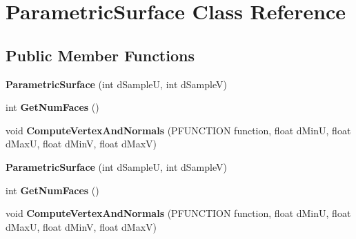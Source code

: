 \hypertarget{class_parametric_surface}{\section{Parametric\+Surface Class Reference}
\label{class_parametric_surface}
}
\subsection*{Public Member Functions}
\begin{DoxyCompactItemize}
\item 
\hypertarget{class_parametric_surface_a01ae5a2fbd7c697c73ae71fe4b2212be}{{\bfseries Parametric\+Surface} (int d\+Sample\+U, int d\+Sample\+V)}\label{class_parametric_surface_a01ae5a2fbd7c697c73ae71fe4b2212be}

\item 
\hypertarget{class_parametric_surface_a4d31f6ed2bc27bdf22fa7dabfb2c92d2}{int {\bfseries Get\+Num\+Faces} ()}\label{class_parametric_surface_a4d31f6ed2bc27bdf22fa7dabfb2c92d2}

\item 
\hypertarget{class_parametric_surface_aaf78314c75302babc08a75e97fabc26b}{void {\bfseries Compute\+Vertex\+And\+Normals} (P\+F\+U\+N\+C\+T\+I\+O\+N function, float d\+Min\+U, float d\+Max\+U, float d\+Min\+V, float d\+Max\+V)}\label{class_parametric_surface_aaf78314c75302babc08a75e97fabc26b}

\item 
\hypertarget{class_parametric_surface_a01ae5a2fbd7c697c73ae71fe4b2212be}{{\bfseries Parametric\+Surface} (int d\+Sample\+U, int d\+Sample\+V)}\label{class_parametric_surface_a01ae5a2fbd7c697c73ae71fe4b2212be}

\item 
\hypertarget{class_parametric_surface_a4d31f6ed2bc27bdf22fa7dabfb2c92d2}{int {\bfseries Get\+Num\+Faces} ()}\label{class_parametric_surface_a4d31f6ed2bc27bdf22fa7dabfb2c92d2}

\item 
\hypertarget{class_parametric_surface_aaf78314c75302babc08a75e97fabc26b}{void {\bfseries Compute\+Vertex\+And\+Normals} (P\+F\+U\+N\+C\+T\+I\+O\+N function, float d\+Min\+U, float d\+Max\+U, float d\+Min\+V, float d\+Max\+V)}\label{class_parametric_surface_aaf78314c75302babc08a75e97fabc26b}

\end{DoxyCompactItemize}
